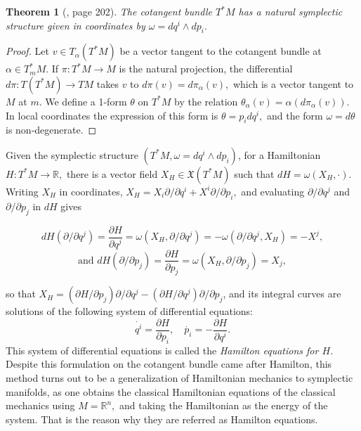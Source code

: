\documentclass[12pt, letterpaper, reqno]{amsart}
\theoremstyle{definition}
\theoremstyle{plain}
\newtheorem{thm}{Theorem}
\theoremstyle{remark}
\begin{document}
\begin{thm}[\cite{arnol2013mathematical}, page 202]
	The cotangent bundle $ T^*M $ has a natural symplectic structure given in coordinates by $\omega = dq^i\wedge dp_i.$
\end{thm}

\begin{proof}
	Let $ v\in T_\alpha \left( T^*M \right)  $ be a vector tangent to the cotangent bundle at $ \alpha\in T^*_m M. $ If $ \pi:T^*M \rightarrow M $ is the natural projection, the differential $ d\pi : T \left( T^*M \right) \rightarrow TM $ takes $ v $ to $ d\pi(v)=d\pi_\alpha(v), $ which is a vector tangent to $ M $ at $ m. $ We define a 1-form $ \theta $ on $ T^*M $ by the relation $ \theta_\alpha(v)=\alpha(d\pi_\alpha(v)). $ In local coordinates the expression of this form is $ \theta= p_i dq^i, $ and the form $ \omega = d\theta $ is non-degenerate. 
\end{proof}

Given the symplectic structure $ (T^*M, \omega = dq^i\wedge dp_i) $, for a Hamiltonian $ H: T^*M \rightarrow \mathbb{R}, $ there is a vector field $ X_H \in \mathfrak{X}(T^*M) $ such that $ dH = \omega (X_H,\cdot) $. Writing $ X_H $ in coordinates, $ X_H = X_i \partial/\partial q^i + X^i \partial/\partial p_i, $ and evaluating $ \partial/\partial q^j $ and $ \partial/\partial p_j $ in $ dH $ gives  

$$ dH(\partial/\partial q^j) = \frac{\partial H}{\partial q^j} = \omega(X_H, \partial/\partial q^j) = -\omega(\partial/\partial q^j, X_H) = -X^j,$$ 
$$\text{and } dH(\partial/\partial p_j) = \frac{\partial H}{\partial p_j} =\omega(X_H, \partial/\partial p_j)=X_j, $$ 

so that $ X_H = (\partial H/\partial p_j)\partial/\partial q^j - (\partial H / \partial q^j)\partial/\partial p_j $, and its integral curves are solutions of the following system of differential equations:
\begin{equation}\label{eq:hamilton_equations}
 \dot{q^i} = \frac{\partial H}{\partial p_i}, \quad \dot{p_i} =- \frac{\partial H}{\partial q^i}.    
\end{equation}
This system of differential equations is called the \textit{Hamilton equations for $ H $.} Despite this formulation on the cotangent bundle came after Hamilton, this method turns out to be a generalization of Hamiltonian mechanics to symplectic manifolds, as one obtains the classical Hamiltonian equations of the classical mechanics using $ M= \mathbb{R}^n, $ and taking the Hamiltonian as the energy of the system. That is the reason why they are referred as Hamilton equations.
\end{document}
